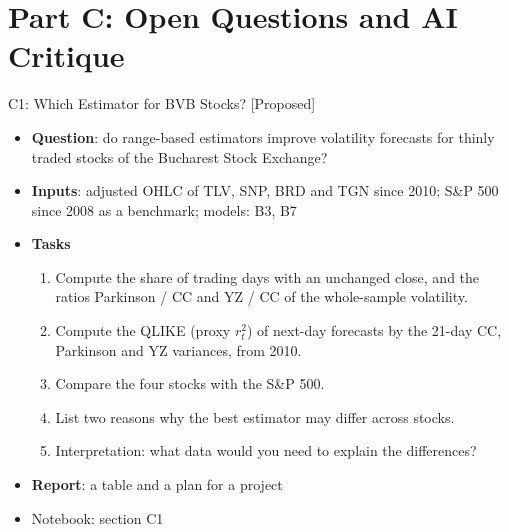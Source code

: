 \section{Part C: Open Questions and AI Critique}

\begin{frame}{C1: Which Estimator for BVB Stocks? [Proposed]}
\itemsize{\footnotesize}
\begin{itemize}
\item \textbf{Question}: do range-based estimators improve volatility forecasts for thinly traded stocks of the Bucharest Stock Exchange?
\item \textbf{Inputs}: adjusted OHLC of TLV, SNP, BRD and TGN since 2010; S\&P 500 since 2008 as a benchmark; models: B3, B7
\item \textbf{Tasks}
\begin{enumerate}
    \item Compute the share of trading days with an unchanged close, and the ratios Parkinson / CC and YZ / CC of the whole-sample volatility.
    \item Compute the QLIKE (proxy $r_t^2$) of next-day forecasts by the 21-day CC, Parkinson and YZ variances, from 2010.
    \item Compare the four stocks with the S\&P 500.
    \item List two reasons why the best estimator may differ across stocks.
    \item Interpretation: what data would you need to explain the differences?
\end{enumerate}
\item \textbf{Report}: a table and a plan for a project
\item Notebook: section C1
\end{itemize}
\end{frame}

